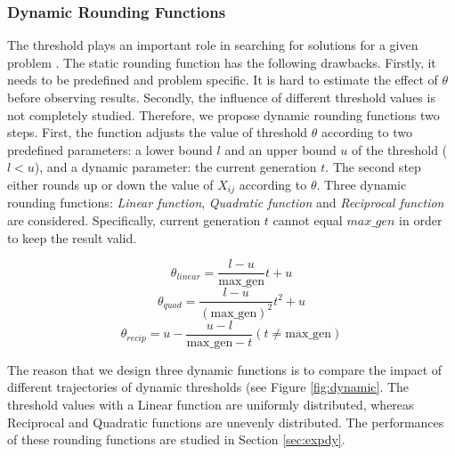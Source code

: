 \documentclass[10pt,journal,compsoc]{IEEEtran}
\begin{document}
\subsubsection{Dynamic Rounding Functions}
\label{sec:dynamic}
The threshold plays an important role in searching for solutions for a given problem \cite{Tan2016a}. The static rounding function has the following drawbacks. Firstly, it needs to be predefined and problem specific. It is hard to estimate the effect of $\theta$ before observing results. Secondly, the influence of different threshold values is not completely studied. Therefore, we propose dynamic rounding functions two steps. First, the function adjusts the value of threshold $\theta$ according to two predefined parameters: a lower bound $l$ and an upper bound $u$ of the threshold ($l < u$), and a dynamic parameter: the current generation $t$. The second step either rounds up or down the value of $X_{ij}$ according to $\theta$. Three dynamic rounding functions: \emph{Linear function}, \emph{Quadratic function} and \emph{Reciprocal function} are considered. Specifically, current generation $t$ cannot equal $max\_gen$ in order to keep the result valid. 
\vspace{-3 mm}
\begin{small}
\begin{equation}
\label{eq:linear}
 \theta_{linear} = \frac{l - u}{\text{max\_gen}} t + u
\end{equation}
\begin{equation}
\label{eq:quadratic}
 \theta_{quad} = \frac{l - u}{(\text{max\_gen})^2} t^2 + u
\end{equation}
\begin{equation}
\label{eq:reciprocal}
 \theta_{recip} = u - \frac{u - l}{\text{max\_gen} - t}  (t \neq \text{max\_gen})
\end{equation}
\end{small}
The reason that we design three dynamic functions is to compare the impact of different trajectories of dynamic thresholds (see Figure \ref{fig:dynamic}. 
The threshold values with a Linear function are uniformly distributed, whereas Reciprocal and Quadratic functions are unevenly distributed. The performances of these rounding functions are studied in Section \ref{sec:expdy}. 
\end{document}

